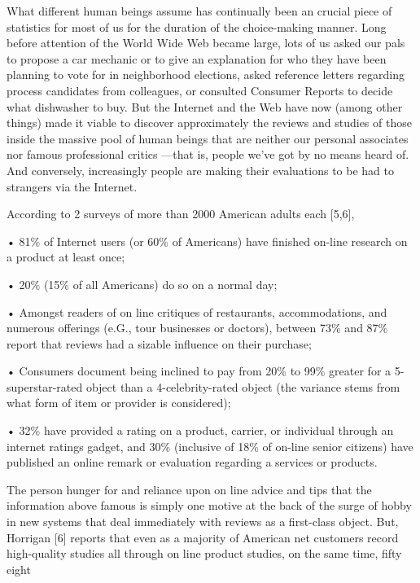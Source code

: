 \documentclass[conference]{IEEEtran}
\begin{document}
What different human beings assume has continually been an crucial piece of statistics for most of us for the duration of the choice-making manner. Long before attention of the World Wide Web became large, lots of us asked our pals to propose a car mechanic or to give an explanation for who they have been planning to vote for in neighborhood elections, asked reference letters regarding process candidates from colleagues, or consulted Consumer Reports to decide what dishwasher to buy. But the Internet and the Web have now (among other things) made it viable to discover approximately the reviews and studies of those inside the massive pool of human beings that are neither our personal associates nor famous professional critics —that is, people we've got by no means heard of. And conversely, increasingly people are making their evaluations to be had to strangers via the Internet.

According to 2 surveys of more than 2000 American adults each [5,6], 

• 81\% of Internet users (or 60\% of Americans) have finished on-line research on a product at least once;

 • 20\% (15\% of all Americans) do so on a normal day; 

• Amongst readers of on line critiques of restaurants, accommodations, and numerous offerings (e.G., tour businesses or doctors), between 73\% and 87\% report that reviews had a sizable influence on their purchase; 

• Consumers document being inclined to pay from 20\% to  99\% greater for a 5-superstar-rated object than a 4-celebrity-rated object (the variance stems from what form of item or provider is considered); 

• 32\% have provided a rating on a product, carrier, or individual through an internet ratings gadget, and 30\% (inclusive of 18\% of on-line senior citizens) have published an online remark or evaluation regarding a services or products. 

The person hunger for and reliance upon on line advice and tips that the information above famous is simply one motive at the back of the surge of hobby in new systems that deal immediately with reviews as a first-class object. But, Horrigan [6] reports that even as a majority of American net customers record high-quality studies all through on line product studies, on the same time, fifty eight%
\end{document}
